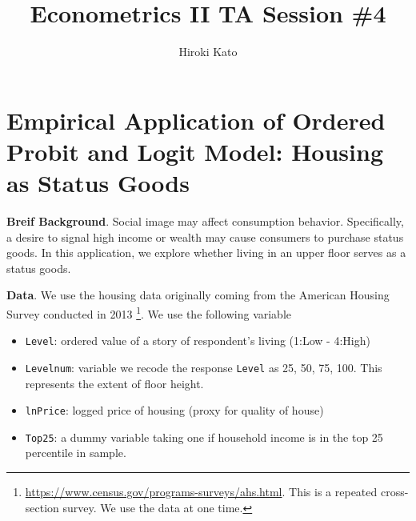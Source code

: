 \documentclass[
  12pt,
]{article}
\title{Econometrics II TA Session \#4}
\author{Hiroki Kato}
\date{}
\providecommand{\tightlist}{%
  \setlength{\itemsep}{0pt}\setlength{\parskip}{0pt}}
\begin{document}
\maketitle

\hypertarget{empirical-application-of-ordered-probit-and-logit-model-housing-as-status-goods}{%
\section{Empirical Application of Ordered Probit and Logit Model:
Housing as Status
Goods}\label{empirical-application-of-ordered-probit-and-logit-model-housing-as-status-goods}}

\textbf{Breif Background}. Social image may affect consumption behavior.
Specifically, a desire to signal high income or wealth may cause
consumers to purchase status goods. In this application, we explore
whether living in an upper floor serves as a status goods.

\noindent \textbf{Data}. We use the housing data originally coming from
the American Housing Survey conducted in 2013 \footnote{\url{https://www.census.gov/programs-surveys/ahs.html}.
  This is a repeated cross-section survey. We use the data at one time.}.
We use the following variable

\begin{itemize}
\tightlist
\item
  \texttt{Level}: ordered value of a story of respondent's living (1:Low
  - 4:High)
\item
  \texttt{Levelnum}: variable we recode the response \texttt{Level} as
  25, 50, 75, 100. This represents the extent of floor height.
\item
  \texttt{lnPrice}: logged price of housing (proxy for quality of house)
\item
  \texttt{Top25}: a dummy variable taking one if household income is in
  the top 25 percentile in sample.
\end{itemize}
\end{document}
